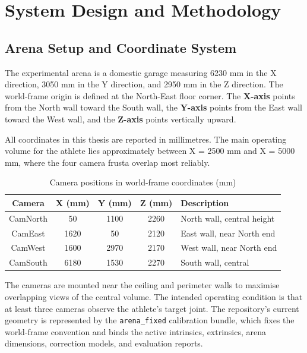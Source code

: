 \chapter{System Design and Methodology}

\section{Arena Setup and Coordinate System}

The experimental arena is a domestic garage measuring 6230 mm in the X direction, 3050 mm in the Y direction, and 2950 mm in the Z direction. The world-frame origin is defined at the North-East floor corner. The \textbf{X-axis} points from the North wall toward the South wall, the \textbf{Y-axis} points from the East wall toward the West wall, and the \textbf{Z-axis} points vertically upward.

All coordinates in this thesis are reported in millimetres. The main operating volume for the athlete lies approximately between X = 2500 mm and X = 5000 mm, where the four camera frusta overlap most reliably.

\begin{table}[htbp]
\centering
\caption{Camera positions in world-frame coordinates (mm)}
\label{tab:3_1}
\begin{tabular}{|c|c|c|c|p{3.5cm}|}
\hline
\textbf{Camera} & \textbf{X (mm)} & \textbf{Y (mm)} & \textbf{Z (mm)} & \textbf{Description} \\
\hline
CamNorth & 50 & 1100 & 2260 & North wall, central height \\
\hline
CamEast & 1620 & 50 & 2120 & East wall, near North end \\
\hline
CamWest & 1600 & 2970 & 2170 & West wall, near North end \\
\hline
CamSouth & 6180 & 1530 & 2270 & South wall, central \\
\hline
\end{tabular}
\end{table}

The cameras are mounted near the ceiling and perimeter walls to maximise overlapping views of the central volume. The intended operating condition is that at least three cameras observe the athlete's target joint. The repository's current geometry is represented by the \texttt{arena\_fixed} calibration bundle, which fixes the world-frame convention and binds the active intrinsics, extrinsics, arena dimensions, correction models, and evaluation reports.

